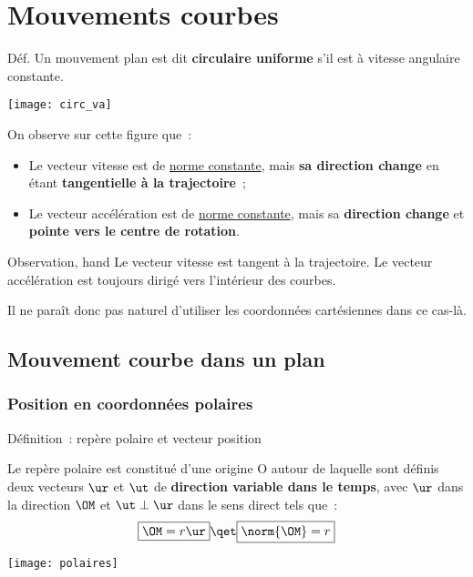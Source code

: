 \documentclass[../main/main.tex]{subfiles}
\begin{document}
\setcounter{chapter}{2}

\chapter{Mouvements courbes}

\begin{rdefi}{Déf.}
	Un mouvement plan est dit \textbf{circulaire uniforme} s'il est à vitesse
	angulaire constante.
\end{rdefi}

\begin{center}
	\texttt{[image: circ\_va]}
\end{center}

On observe sur cette figure que~: \bigbreak
\begin{itemize}
	\item Le vecteur vitesse est de \underline{norme constante}, mais \textbf{sa
		      direction change} en étant \textbf{tangentielle à la trajectoire}~;
	\item Le vecteur accélération est de \underline{norme constante}, mais sa
	      \textbf{direction change} et \textbf{pointe vers le centre de rotation}.
\end{itemize}

\begin{tror}{Observation, hand}
	\centering
	Le vecteur vitesse est tangent à la trajectoire. Le vecteur accélération est
	toujours dirigé vers l’intérieur des courbes.
\end{tror}

Il ne paraît donc pas naturel d'utiliser les coordonnées cartésiennes dans ce
cas-là.

\section{Mouvement courbe dans un plan}
\subsection{Position en coordonnées polaires}

\begin{tdefi}{Définition~: repère polaire et vecteur position}
	\begin{minipage}{0.60\linewidth}
		Le repère polaire est constitué d'une origine O autour de laquelle sont
		définis deux vecteurs $\ur$ et $\ut$ de \textbf{direction
			variable dans le temps}, avec $\ur$ dans la direction $\OM$ et $\ut
			\perp \ur$ dans le sens direct tels que~:
		\[\boxed{\OM = r\ur}
			\qet
			\boxed{\norm{\OM} = r}\]
	\end{minipage}
	\hfill
	\begin{minipage}{0.35\linewidth}
		\begin{center}
			\texttt{[image: polaires]}
		\end{center}
	\end{minipage}
\end{tdefi}
\end{document}
